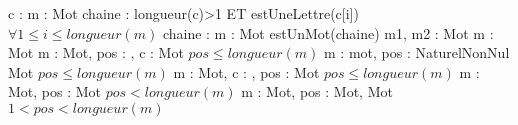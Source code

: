\begin{algorithme}
		{c : \caractere}%
		{\booleen}
		{m : Mot}%
		{\naturelNonNul}
		{chaine : \chaine}%
		{\booleen}%
		{longueur(c)>1 ET estUneLettre(c[i]) $\forall 1\leq i \leq longueur(m)$}
		{chaine : \chaine}%
		{m : Mot}%
		{estUnMot(chaine)}
		{m1, m2 : Mot}%
		{\booleen}
		{m : Mot}%
		{\chaine}
		{m : Mot, pos : \naturelNonNul, c : \caractere}%
		{Mot}%
		{$pos \leq longueur(m)$}
		{m : mot, pos : NaturelNonNul}%
		{Mot}%
		{$pos \leq longueur(m)$}
		{m : Mot, c : \caractere, pos : \naturelNonNul}%
		{Mot}%
		{$pos \leq longueur(m)$}
		{m : Mot, pos : \naturelNonNul}%
		{Mot}%
		{$pos < longueur(m)$}
		{m : Mot, pos : \naturelNonNul}%
		{Mot, Mot}%
		{$1 < pos < longueur(m)$}
\end{algorithme}
